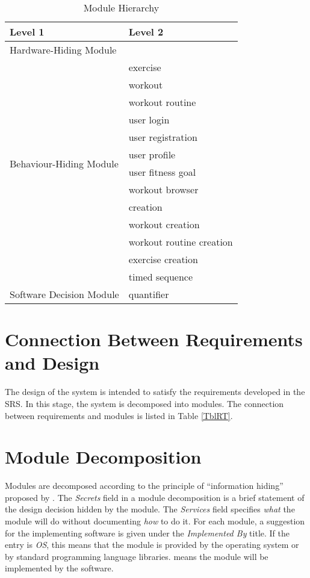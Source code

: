 \documentclass[12pt, titlepage]{article}
\begin{document}
\begin{table}[h!]
\centering
\begin{tabular}{p{} p{}}
\toprule
\textbf{Level 1} & \textbf{Level 2}\\
\midrule

{Hardware-Hiding Module} & ~ \\
\midrule

\multirow{12}{0.3\textwidth}{Behaviour-Hiding Module}
& exercise\\
& workout\\
& workout routine\\
& user login\\
& user registration\\
& user profile\\ 
& user fitness goal\\
& workout browser\\
& creation\\
& workout creation\\
& workout routine creation\\
& exercise creation\\
& timed sequence\\
\midrule

\multirow{1}{0.3\textwidth}{Software Decision Module}
& quantifier\\
\bottomrule

\end{tabular}
\caption{Module Hierarchy}
\label{TblMH}
\end{table}

\section{Connection Between Requirements and Design} \label{SecConnection}

The design of the system is intended to satisfy the requirements developed in
the SRS. In this stage, the system is decomposed into modules. The connection
between requirements and modules is listed in Table \ref{TblRT}.

\section{Module Decomposition} \label{SecMD}

Modules are decomposed according to the principle of ``information hiding''
proposed by \citet{ParnasEtAl1984}. The \emph{Secrets} field in a module
decomposition is a brief statement of the design decision hidden by the
module. The \emph{Services} field specifies \emph{what} the module will do
without documenting \emph{how} to do it. For each module, a suggestion for the
implementing software is given under the \emph{Implemented By} title. If the
entry is \emph{OS}, this means that the module is provided by the operating
system or by standard programming language libraries.  \emph{\progname{}} means the
module will be implemented by the \progname{} software.
\end{document}
